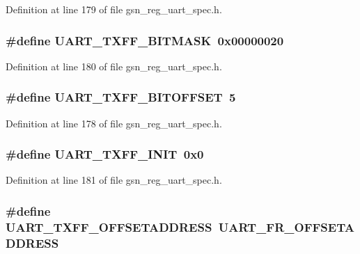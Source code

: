 Definition at line 179 of file gsn\_\-reg\_\-uart\_\-spec.h.

\hypertarget{a00575_a6083f4fe5b9e06516585b47e061745a9}{
\subsubsection[{UART\_\-TXFF\_\-BITMASK}]{\setlength{\rightskip}{0pt plus 5cm}\#define UART\_\-TXFF\_\-BITMASK~0x00000020}}
\label{a00575_a6083f4fe5b9e06516585b47e061745a9}


Definition at line 180 of file gsn\_\-reg\_\-uart\_\-spec.h.

\hypertarget{a00575_a39ec320b58ff691e2ef58b16f4c716aa}{
\subsubsection[{UART\_\-TXFF\_\-BITOFFSET}]{\setlength{\rightskip}{0pt plus 5cm}\#define UART\_\-TXFF\_\-BITOFFSET~5}}
\label{a00575_a39ec320b58ff691e2ef58b16f4c716aa}


Definition at line 178 of file gsn\_\-reg\_\-uart\_\-spec.h.

\hypertarget{a00575_a421fd313f7b40b4cba7b66ce1b3ddd7b}{
\subsubsection[{UART\_\-TXFF\_\-INIT}]{\setlength{\rightskip}{0pt plus 5cm}\#define UART\_\-TXFF\_\-INIT~0x0}}
\label{a00575_a421fd313f7b40b4cba7b66ce1b3ddd7b}


Definition at line 181 of file gsn\_\-reg\_\-uart\_\-spec.h.

\hypertarget{a00575_a9ae7bc9ed3e3600ee6d1ba01d09a1881}{
\subsubsection[{UART\_\-TXFF\_\-OFFSETADDRESS}]{\setlength{\rightskip}{0pt plus 5cm}\#define UART\_\-TXFF\_\-OFFSETADDRESS~UART\_\-FR\_\-OFFSETADDRESS}}
\label{a00575_a9ae7bc9ed3e3600ee6d1ba01d09a1881}


